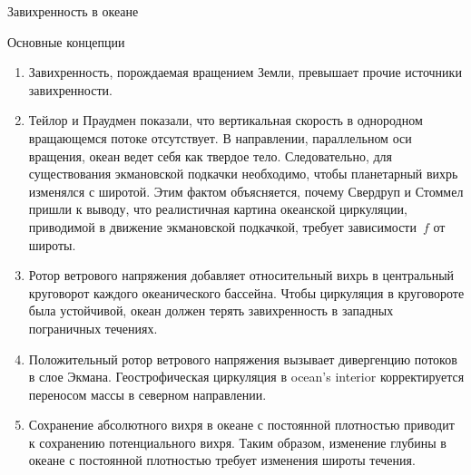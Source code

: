 \begin{chapter}{Завихренность в океане}
\begin{section}{Основные концепции}
\begin{enumerate}
\item
Завихренность, порождаемая вращением Земли, превышает прочие источники
завихренности.
%

\item
Тейлор и Праудмен показали, что вертикальная скорость в однородном вращающемся 
потоке отсутствует. В направлении, параллельном оси вращения, океан ведет себя
как твердое тело. Следовательно, для существования экмановской 
подкачки необходимо, чтобы планетарный вихрь
изменялся с широтой. Этим фактом объясняется, почему Свердруп и Стоммел
пришли к выводу, что реалистичная картина океанской циркуляции, приводимой 
в движение экмановской подкачкой, требует зависимости~$f$ от широты.
%

\item
Ротор ветрового напряжения 
добавляет относительный вихрь в центральный круговорот каждого океанического 
бассейна. Чтобы циркуляция в круговороте была устойчивой, океан должен
терять завихренность в западных пограничных течениях.
%

\item
Положительный ротор ветрового напряжения вызывает дивергенцию потоков в
слое Экмана. Геострофическая циркуляция в ocean's interior
корректируется переносом массы в северном направлении.
%

\item
Сохранение абсолютного вихря 
в океане с постоянной плотностью приводит к сохранению потенциального вихря.
Таким образом, изменение глубины в океане с постоянной плотностью требует 
изменения широты течения.
%
\end{enumerate}
\end{section}
\end{chapter}
